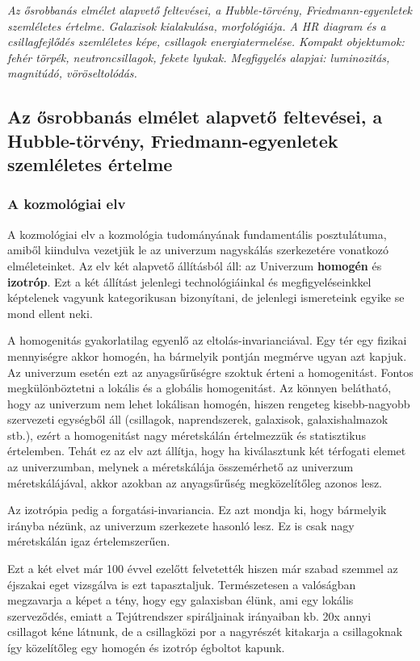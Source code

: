 \documentclass[../main.tex]{subfiles}
\begin{document}
\textit{
    Az ősrobbanás elmélet alapvető feltevései, a Hubble-törvény, Friedmann-egyenletek szemléletes értelme. Galaxisok kialakulása, morfológiája. A HR diagram és a csillagfejlődés szemléletes képe,
    csillagok energiatermelése. Kompakt objektumok: fehér törpék, neutroncsillagok, fekete lyukak. Megfigyelés alapjai: luminozitás, magnitúdó, vöröseltolódás.
}

\subsection{Az ősrobbanás elmélet alapvető feltevései, a Hubble-törvény, Friedmann-egyenletek szemléletes értelme \cite{inflation_cosmology}}

\subsubsection{A kozmológiai elv}
A kozmológiai elv a kozmológia tudományának fundamentális posztulátuma, amiből kiindulva vezetjük le az univerzum nagyskálás szerkezetére vonatkozó elméleteinket. Az elv két alapvető állításból áll:
az Univerzum \textbf{homogén} és \textbf{izotróp}. Ezt a két állítást jelenlegi technológiáinkal és megfigyeléseinkkel képtelenek vagyunk kategorikusan bizonyítani, de jelenlegi ismereteink egyike se mond
ellent neki. 

A homogenitás gyakorlatilag egyenlő az eltolás-invarianciával. Egy tér egy fizikai mennyiségre akkor homogén, ha bármelyik pontján megmérve ugyan azt kapjuk. Az univerzum esetén ezt az anyagsűrűségre szoktuk
érteni a homogenitást. Fontos megkülönböztetni a lokális és a globális homogenitást. Az könnyen belátható, hogy az univerzum nem lehet lokálisan homogén, hiszen rengeteg kisebb-nagyobb szervezeti egységből áll
(csillagok, naprendszerek, galaxisok, galaxishalmazok stb.), ezért a homogenitást nagy méretskálán értelmezzük és statisztikus értelemben. Tehát ez az elv azt állítja, hogy ha kiválasztunk két térfogati 
elemet az univerzumban, melynek a méretskálája összemérhető az univerzum méretskálájával, akkor azokban az anyagsűrűség megközelítőleg azonos lesz.

Az izotrópia pedig a forgatási-invariancia. Ez azt mondja ki, hogy bármelyik irányba nézünk, az univerzum szerkezete hasonló lesz. Ez is csak nagy méretskálán igaz értelemszerűen.

Ezt a két elvet már 100 évvel ezelőtt felvetették hiszen már szabad szemmel az éjszakai eget vizsgálva is ezt tapasztaljuk. Természetesen a valóságban megzavarja a képet a tény, hogy egy galaxisban élünk,
ami egy lokális szerveződés, emiatt a Tejútrendszer spiráljainak irányaiban kb. 20x annyi csillagot kéne látnunk, de a csillagközi por a nagyrészét kitakarja a csillagoknak így közelítőleg egy homogén és izotróp égboltot kapunk.
\end{document}

